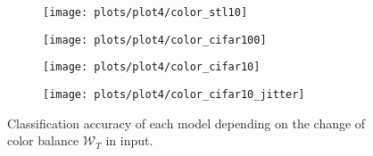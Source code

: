     \begin{figure}[h!]
    \begin{adjustwidth}{-11em}{-11em}
        \centering
        \begin{subfigure}{0.6\textwidth}
            \texttt{[image: plots/plot4/color\_stl10]}
        \end{subfigure}
        \begin{subfigure}{0.6\textwidth}
            \texttt{[image: plots/plot4/color\_cifar100]}
        \end{subfigure}
        \begin{subfigure}{0.6\textwidth}
            \texttt{[image: plots/plot4/color\_cifar10]}
        \end{subfigure}
        \begin{subfigure}{0.6\textwidth}
            \texttt{[image: plots/plot4/color\_cifar10\_jitter]}
        \end{subfigure}
    \end{adjustwidth}
        \caption{Classification accuracy of each model depending on the change
        of color balance $\mathcal{W}_T$ in input.}
        \label{fig:plot4color}
    \end{figure}

\clearpage
